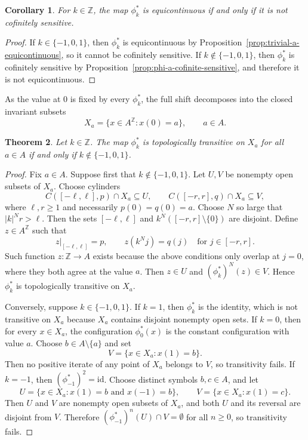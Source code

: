 \documentclass[12pt,a4paper]{article}
\newtheorem{theorem}{Theorem}[section]
\newtheorem{corollary}[theorem]{Corollary}
\theoremstyle{definition}
\theoremstyle{remark}
\newcommand{\ZZ}{\mathbb{Z}}
\begin{document}
\begin{corollary}\label{thm:Z-dichotomy}
For $k\in\ZZ$, the map $\phi_k^*$ is equicontinuous if and only if it is not cofinitely sensitive.
\end{corollary}

\begin{proof}
If $k\in\{-1,0,1\}$, then $\phi_k^*$ is equicontinuous by Proposition~\ref{prop:trivial-a-equicontinuous}, so it cannot be cofinitely sensitive. If $k\notin\{-1,0,1\}$, then $\phi_k^*$ is cofinitely sensitive by Proposition~\ref{prop:phi-a-cofinite-sensitive}, and therefore it is not equicontinuous.
\end{proof}

As the value at $0$ is fixed by every $\phi_k^*$, the full shift decomposes into the closed invariant subsets
\[ X_a = \{x\in A^\ZZ: x(0)=a\}, \qquad a \in A. \]

\begin{theorem}\label{thm:Z-transitivity}
Let $k\in\ZZ$. The map $\phi_k^*$ is topologically transitive on $X_a$ for all $a \in A$ if and only if $k\notin\{-1,0,1\}$.
\end{theorem}

\begin{proof}
Fix $a \in A$. Suppose first that $k\notin\{-1,0,1\}$. Let $U,V$ be nonempty open subsets of $X_a$. Choose cylinders
\[
C([-\ell,\ell],p)\cap X_a\subseteq U,
\qquad
C([-r,r],q)\cap X_a\subseteq V,
\]
where $\ell,r\geq 1$ and necessarily $p(0)=q(0)=a$. Choose $N$ so large that $|k|^N r>\ell$. Then the sets $[-\ell,\ell]$ and $k^N([-r,r]\setminus\{0\})$ are disjoint. Define $z\in A^\ZZ$ such that
\[
z|_{[-\ell,\ell]}=p,
\qquad
z(k^Nj)=q(j)\quad\text{for }j\in[-r,r].
\]
Such function $z : \ZZ \to A$ exists because the above conditions only overlap at $j=0$, where they both agree at the value $a$. Then $z\in U$ and $(\phi_k^*)^N(z)\in V$. Hence $\phi_k^*$ is topologically transitive on $X_a$.

Conversely, suppose $k\in\{-1,0,1\}$. If $k=1$, then $\phi_k^*$ is the identity, which is not transitive on $X_a$ because $X_a$ contains disjoint nonempty open sets. If $k=0$, then for every $x\in X_a$, the configuration $\phi_0^*(x)$ is the constant configuration with value $a$. Choose $b\in A\setminus\{a\}$ and set
\[
V=\{x\in X_a:x(1)=b\}.
\]
Then no positive iterate of any point of $X_a$ belongs to $V$, so transitivity fails. If $k=-1$, then $(\phi_{-1}^*)^2=\mathrm{id}$. Choose distinct symbols $b,c\in A$, and let
\[
U=\{x\in X_a:x(1)=b \text{ and } x(-1)=b\},
\qquad
V=\{x\in X_a:x(1)=c\}.
\]
Then $U$ and $V$ are nonempty open subsets of $X_a$, and both $U$ and its reversal are disjoint from $V$. Therefore $(\phi_{-1}^*)^n(U)\cap V=\emptyset$ for all $n\geq 0$, so transitivity fails.
\end{proof}
\end{document}
